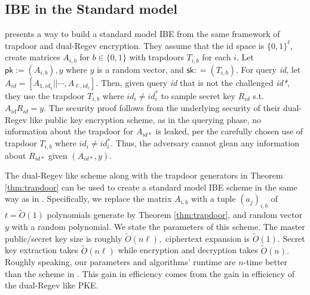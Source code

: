 \documentclass[11pt]{article}
\newcommand{\Z}{\mathbb{Z}}
\newcommand{\sk}{\mathsf{sk}}
\newcommand{\pk}{\mathsf{pk}}
\begin{document}
\subsection{IBE in the Standard model}
\cite{CHKP} presents a way to build a standard model IBE from the same framework of trapdoor and dual-Regev encryption. They assume that the id space is $\{0,1\}^{\ell},$ create matrices $A_{i, b}$ for $b\in \{0,1\}$ with trapdoors  $T_{i,b}$ for each $i.$ Let $\pk:=(A_{i,b}), y$ where $y$ is a random vector, and $\sk : = (T_{i,b}).$ For query \textit{id}, let $A_{id} = [A_{1,id_1} || \cdots, A_{\ell, id_{\ell}} ].$ Then, given query \textit{id} that is not the challenged \textit{id*}, they use the trapdoor $T_{i,b}$ where $id_i \neq id^*_i$ to sample secret key $R_{id}$ s.t. $A_{id} R_{id} = y.$ The security proof follows from the underlying security of their dual-Regev like public key encryption scheme, as in the querying phase, no information about the trapdoor for $A_{id*}$ is leaked, per the carefully chosen use of trapdoor $T_{i,b}$ where $id_i \neq id^*_i$. Thus, the adversary cannot glean any information about $R_{id*} $ given $(A_{id*},y).$

The dual-Regev like scheme along with the trapdoor generators in Theorem \ref{thm:trapdoor} can be used to create a standard model IBE scheme in the same way as in \cite{CHKP}. Specifically, we replace the matrix $A_{i,b}$ with a tuple $(a_j)_{i,b}$ of $t = \tilde{O}(1)$ polynomials generate by Theorem \ref{thm:trapdoor}, and random vector $y$ with a random polynomial. We state the parameters of this scheme. The master public/secret key size is roughly $\tilde{O}(n\ell),$ ciphertext expansion is $\tilde{O}(1).$ Secret key extraction takes $\tilde{O}(n \ell)$ while encryption and decryption takes $\tilde{O}(n).$ Roughly speaking, our parameters and algorithms' runtime are $n$-time better than the scheme in \cite{CHKP}. This gain in efficiency comes from the gain in efficiency of the dual-Regev like PKE.  

\end{document}
